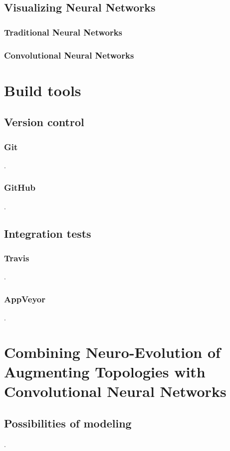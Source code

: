 \documentclass[11pt]{article}
\begin{document}
		\subsection{Visualizing Neural Networks}
			\subsubsection{Traditional Neural Networks}
			
			\subsubsection{Convolutional Neural Networks}
	\newpage

	\section{Build tools}
		\subsection{Version control}
			\subsubsection{Git}
				.
			\subsubsection{GitHub}
				.
		\subsection{Integration tests}
			\subsubsection{Travis}
				.
			\subsubsection{AppVeyor}
				.
	\newpage

	\section{Combining Neuro-Evolution of Augmenting Topologies with Convolutional Neural Networks}
		\subsection{Possibilities of modeling}
			.
\end{document}
